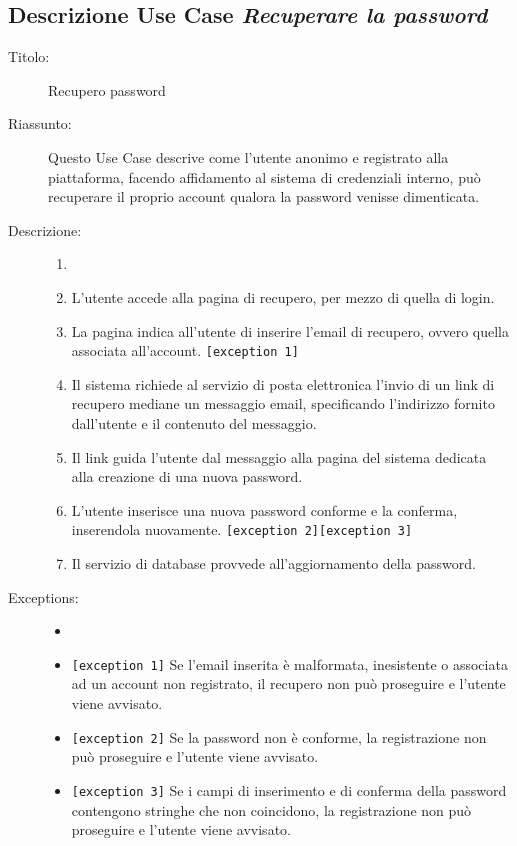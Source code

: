 \documentclass[11pt, a4paper]{article}
\theoremstyle{definition} %
\begin{document}
\subsection*{Descrizione Use Case \textit{Recuperare la password}}
\begin{description}
    \item[Titolo:] Recupero password
    
    \item[Riassunto:] Questo Use Case descrive come l'utente anonimo e
    registrato alla piattaforma, facendo affidamento al sistema di credenziali
    interno, può recuperare il proprio account qualora la password venisse dimenticata.

    \item[Descrizione:]
    \begin{enumerate}
        \item[]
        \item L'utente accede alla pagina di recupero, per mezzo di quella di login.
        \item La pagina indica all'utente di inserire l'email di recupero, ovvero quella associata all'account. \verb|[exception 1]|
        \item Il sistema richiede al servizio di posta elettronica l'invio di un link di recupero mediane un messaggio email, specificando l'indirizzo fornito dall'utente e il contenuto del messaggio.
        \item Il link guida l'utente dal messaggio alla pagina del sistema dedicata alla creazione di una nuova password.
        \item L'utente inserisce una nuova password conforme e la conferma, inserendola nuovamente. \verb|[exception 2]|\verb|[exception 3]|
        \item Il servizio di database provvede all'aggiornamento della password.
    \end{enumerate}
    
    \item[Exceptions:]
    \begin{itemize}
        \item[]
        \item \verb|[exception 1]| Se l'email inserita è malformata, inesistente o associata ad un account non registrato, il recupero non può proseguire e l'utente viene avvisato.
        \item \verb|[exception 2]| Se la password non è conforme, la registrazione non può proseguire e l'utente viene avvisato.
        \item \verb|[exception 3]| Se i campi di inserimento e di conferma della password contengono stringhe che non coincidono, la registrazione non può proseguire e l'utente viene avvisato.
    \end{itemize}
    
\end{description}
\end{document}
